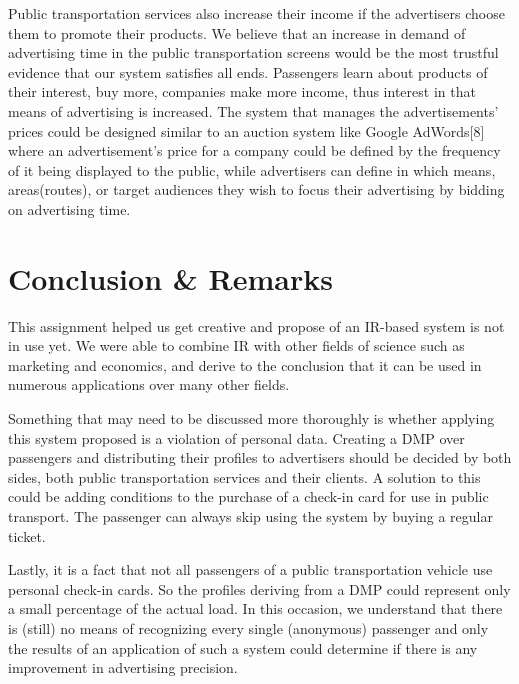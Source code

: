 \documentclass[letterpaper,11pt]{article}
\begin{document}
Public transportation services also increase their income if the advertisers choose them to promote their products. We believe that an increase in demand of advertising time in the public transportation screens would be the most trustful evidence that our system satisfies all ends. Passengers learn about products of their interest, buy more, companies make more income, thus interest in that means of advertising is increased. The system that manages the advertisements' prices could be designed similar to an auction system like Google AdWords[8] where an advertisement's price for a company could be defined by the frequency of it being displayed to the public, while advertisers can define in which means, areas(routes), or target audiences they wish to focus their advertising by bidding on advertising time. 



\section{Conclusion \& Remarks}

This assignment helped us get creative and propose of an IR-based system is not in use yet. We were able to combine IR with other fields of science such as marketing and economics, and derive to the conclusion that it can be used in numerous applications over many other fields. 

Something that may need to be discussed more thoroughly is whether applying this system proposed is a violation of personal data. Creating a DMP over passengers and distributing their profiles to advertisers should be decided by both sides, both public transportation services and their clients. A solution to this could be adding conditions to the purchase of a check-in card for use in public transport. The passenger can always skip using the system by buying a regular ticket.

Lastly, it is a fact that not all passengers of a public transportation vehicle use personal check-in cards. So the profiles deriving from a DMP could represent only a small percentage of the actual load. In this occasion, we understand that there is (still) no means of recognizing every single (anonymous) passenger and only the results of an application of such a system could determine if there is any improvement in advertising precision. 
\end{document}
